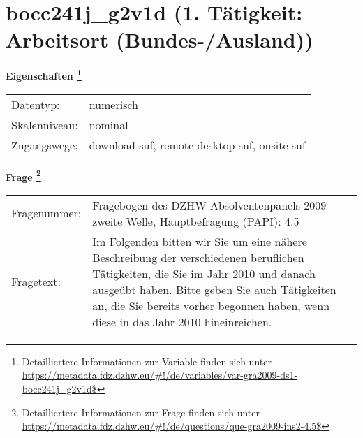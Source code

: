 
    \setcounter{footnote}{0}

    \vspace*{-1.8cm}
	\section{bocc241j\_g2v1d (1. Tätigkeit: Arbeitsort (Bundes-/Ausland))}
	\label{section:bocc241j_g2v1d}



    \vspace*{0.5cm}
    \noindent\textbf{Eigenschaften
	\footnote{Detailliertere Informationen zur Variable finden sich unter
		\url{https://metadata.fdz.dzhw.eu/\#!/de/variables/var-gra2009-ds1-bocc241j_g2v1d$}}}\\
	\begin{tabularx}{\hsize}{@{}lX}
	Datentyp: & numerisch \\
	Skalenniveau: & nominal \\
	Zugangswege: &
	  download-suf, 
	  remote-desktop-suf, 
	  onsite-suf
 \\
    \end{tabularx}



				\vspace*{0.5cm}
                \noindent\textbf{Frage
	                \footnote{Detailliertere Informationen zur Frage finden sich unter
		              \url{https://metadata.fdz.dzhw.eu/\#!/de/questions/que-gra2009-ins2-4.5$}}}\\
				\begin{tabularx}{\hsize}{@{}lX}
					Fragenummer: &
					  Fragebogen des DZHW-Absolventenpanels 2009 - zweite Welle, Hauptbefragung (PAPI):
					  4.5
 \\
					Fragetext: & Im Folgenden bitten wir Sie um eine nähere Beschreibung der verschiedenen beruflichen Tätigkeiten, die Sie im Jahr 2010 und danach ausgeübt haben. Bitte geben Sie auch Tätigkeiten an, die Sie bereits vorher begonnen haben, wenn diese in das Jahr 2010 hineinreichen. \\
				\end{tabularx}





